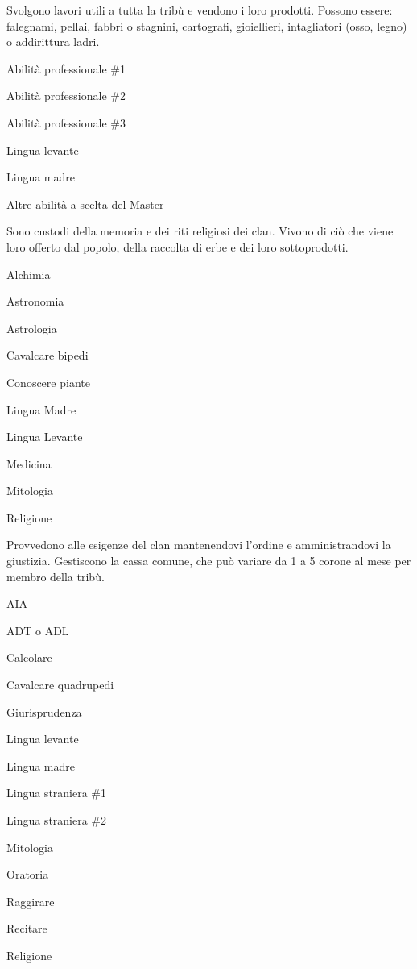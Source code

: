 
Svolgono lavori utili a tutta la trib\`u e vendono i loro prodotti.
Possono essere: falegnami, pellai, fabbri o stagnini, cartografi,
gioiellieri, intagliatori (osso, legno) o addirittura ladri.

\begin{abilist}
\item Abilit\`a professionale \#1 
\item Abilit\`a professionale \#2 
\item Abilit\`a professionale \#3 
\item Lingua levante 
\item Lingua madre 
\item Altre abilit\`a a scelta del Master 
\end{abilist}


Sono custodi della memoria e dei riti religiosi dei clan. Vivono di
ci\`o che viene loro offerto dal popolo, della raccolta di erbe e dei
loro sottoprodotti.

\begin{abilist}
\item Alchimia 
\item Astronomia 
\item Astrologia 
\item Cavalcare bipedi 
\item Conoscere piante 
\item Lingua Madre 
\item Lingua Levante 
\item Medicina 
\item Mitologia 
\item Religione 
\end{abilist}


Provvedono alle esigenze del clan mantenendovi l'ordine e amministrandovi la
giustizia. Gestiscono la cassa comune, che pu\`o variare da 1 a 5 corone
al mese per membro della trib\`u.

\begin{abilist}
\item AIA 
\item ADT o ADL 
\item Calcolare 
\item Cavalcare quadrupedi 
\item Giurisprudenza 
\item Lingua levante 
\item Lingua madre 
\item Lingua straniera \#1 
\item Lingua straniera \#2 
\item Mitologia 
\item Oratoria 
\item Raggirare 
\item Recitare 
\item Religione
\end{abilist}



